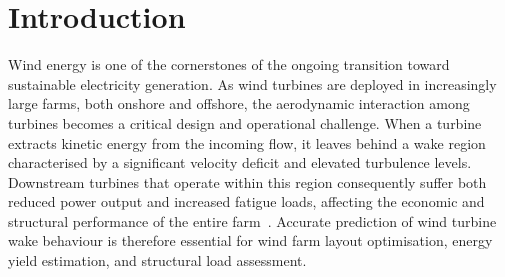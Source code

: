 \section{Introduction}
\label{introduction}
Wind energy is one of the cornerstones of the ongoing transition toward sustainable electricity generation. As wind turbines are deployed in increasingly large farms, both onshore and offshore, the aerodynamic interaction among turbines becomes a critical design and operational challenge. When a turbine extracts kinetic energy from the incoming flow, it leaves behind a wake region characterised by a significant velocity deficit and elevated turbulence levels. Downstream turbines that operate within this region consequently suffer both reduced power output and increased fatigue loads, affecting the economic and structural performance of the entire farm~\cite{Porte-Agel2020}. Accurate prediction of wind turbine wake behaviour is therefore essential for wind farm layout optimisation, energy yield estimation, and structural load assessment.

